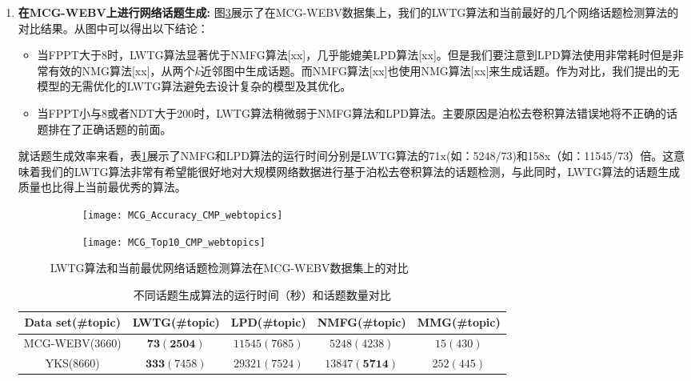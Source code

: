 \begin{enumerate}
  \item[1)] \textbf{在MCG-WEBV上进行网络话题生成:} 图\ref{fig:MCG_CMP_webtopics}展示了在MCG-WEBV数据集上，我们的LWTG算法和当前最好的几个网络话题检测算法的对比结果。从图中可以得出以下结论：
  \begin{itemize}
    \item 当FPPT大于8时，LWTG算法显著优于NMFG算法[xx]，几乎能媲美LPD算法[xx]。但是我们要注意到LPD算法使用非常耗时但是非常有效的NMG算法[xx]，从两个$k$近邻图中生成话题。而NMFG算法[xx]也使用NMG算法[xx]来生成话题。作为对比，我们提出的无模型的无需优化的LWTG算法避免去设计复杂的模型及其优化。
    \item 当FPPT小与8或者NDT大于200时，LWTG算法稍微弱于NMFG算法和LPD算法。主要原因是泊松去卷积算法错误地将不正确的话题排在了正确话题的前面。
  \end{itemize}

  就话题生成效率来看，表\ref{tab:webtopics_time_cmp}展示了NMFG和LPD算法的运行时间分别是LWTG算法的71x(如：5248/73)和158x（如：11545/73）倍。这意味着我们的LWTG算法非常有希望能很好地对大规模网络数据进行基于泊松去卷积算法的话题检测，与此同时，LWTG算法的话题生成质量也比得上当前最优秀的算法。
  \begin{figure}[!htbp]
    \centering
    \begin{subfigure}[b]{0.5\textwidth}
      \texttt{[image: MCG\_Accuracy\_CMP\_webtopics]}
      \caption{}
      \label{fig:MCG_Accuracy_CMP_webtopics}
    \end{subfigure}%
    \begin{subfigure}[b]{0.5\textwidth}
      \texttt{[image: MCG\_Top10\_CMP\_webtopics]}
      \caption{}
      \label{fig:MCG_Top10_CMP_webtopics}
    \end{subfigure}
    \caption{LWTG算法和当前最优网络话题检测算法在MCG-WEBV数据集上的对比}
    \label{fig:MCG_CMP_webtopics}
  \end{figure}

  \begin{table}[!htbp]
      \caption{不同话题生成算法的运行时间（秒）和话题数量对比}
      \label{tab:webtopics_time_cmp}
      \centering 
      \begin{tabular}{|c|c|c|c|c|}
          \hline
          Data set(\#topic) & LWTG(\#topic) & LPD(\#topic) & NMFG(\#topic) & MMG(\#topic)\\
          \hline
          \hline
          MCG-WEBV(3660) & $\mathbf{73}(\mathbf{2504})$ & $11545(7685)$ & $5248(4238)$ & $15(430)$\\
          \hline
          YKS(8660) & $\mathbf{333}(7458)$ & $29321(7524)$ & $13847(\mathbf{5714})$ & 2$52(445)$\\
          \hline
      \end{tabular}
  \end{table}


\end{enumerate}
